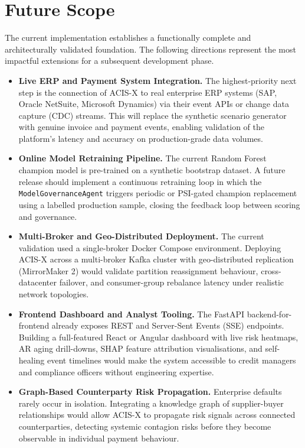 \documentclass[a4paper, 12pt]{report}
\begin{document}
\section{Future Scope}
The current implementation establishes a functionally complete and architecturally validated foundation. The following directions represent the most impactful extensions for a subsequent development phase.

\begin{itemize}[itemsep=4pt]
    \item \textbf{Live ERP and Payment System Integration.} The highest-priority next step is the connection of ACIS-X to real enterprise ERP systems (SAP, Oracle NetSuite, Microsoft Dynamics) via their event APIs or change data capture (CDC) streams. This will replace the synthetic scenario generator with genuine invoice and payment events, enabling validation of the platform's latency and accuracy on production-grade data volumes.

    \item \textbf{Online Model Retraining Pipeline.} The current Random Forest champion model is pre-trained on a synthetic bootstrap dataset. A future release should implement a continuous retraining loop in which the \texttt{ModelGovernanceAgent} triggers periodic or PSI-gated champion replacement using a labelled production sample, closing the feedback loop between scoring and governance.

    \item \textbf{Multi-Broker and Geo-Distributed Deployment.} The current validation used a single-broker Docker Compose environment. Deploying ACIS-X across a multi-broker Kafka cluster with geo-distributed replication (MirrorMaker 2) would validate partition reassignment behaviour, cross-datacenter failover, and consumer-group rebalance latency under realistic network topologies.

    \item \textbf{Frontend Dashboard and Analyst Tooling.} The FastAPI backend-for-frontend already exposes REST and Server-Sent Events (SSE) endpoints. Building a full-featured React or Angular dashboard with live risk heatmaps, AR aging drill-downs, SHAP feature attribution visualisations, and self-healing event timelines would make the system accessible to credit managers and compliance officers without engineering expertise.

    \item \textbf{Graph-Based Counterparty Risk Propagation.} Enterprise defaults rarely occur in isolation. Integrating a knowledge graph of supplier-buyer relationships would allow ACIS-X to propagate risk signals across connected counterparties, detecting systemic contagion risks before they become observable in individual payment behaviour.


\end{itemize}
\end{document}
